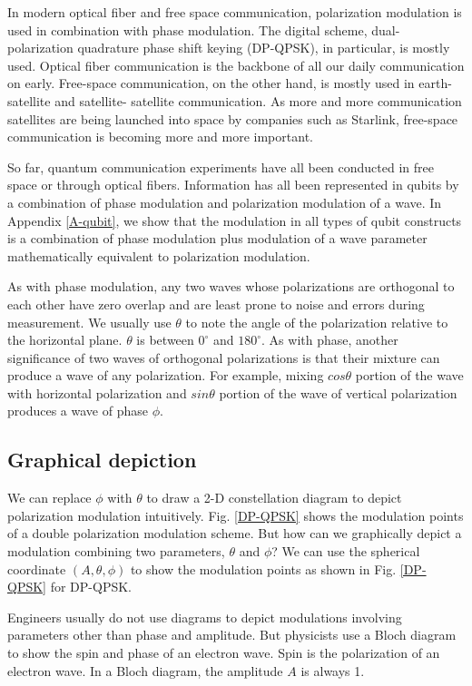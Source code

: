 \documentclass[oneside, letter, 12pt]{book}
\begin{document}
In modern optical fiber and free space communication, polarization modulation is used in combination with phase modulation. The digital scheme, dual-polarization quadrature phase shift keying (DP-QPSK), in particular, is mostly used. Optical fiber communication is the backbone of all our daily communication on early. Free-space communication, on the other hand, is mostly used in earth-satellite and satellite- satellite communication. As more and more communication satellites are being launched into space by companies such as Starlink, free-space communication is becoming more and more important.

So far, quantum communication experiments have all been conducted in free space or through optical fibers. Information has all been represented in qubits by a combination of phase modulation and polarization modulation of a wave. In Appendix \ref{A-qubit}, we show that the modulation in all types of qubit constructs is a combination of phase modulation plus modulation of a wave parameter mathematically equivalent to polarization modulation.

As with phase modulation, any two waves whose polarizations are orthogonal to each other have zero overlap and are least prone to noise and errors during measurement. We usually use $\theta$ to note the angle of the polarization relative to the horizontal plane. $\theta$ is between $0^\circ$ and $180^\circ$. As with phase, another significance of two waves of orthogonal polarizations is that their mixture can produce a wave of any polarization. For example, mixing $cos\theta$ portion of the wave with horizontal polarization and $sin\theta$ portion of the wave of vertical polarization produces a wave of phase $\phi$. 

\subsection{Graphical depiction}
We can replace $\phi$ with $\theta$ to draw a 2-D constellation diagram to depict polarization modulation intuitively. Fig. \ref{DP-QPSK} shows the modulation points of a double polarization modulation scheme. But how can we graphically depict a modulation combining two parameters, $\theta$ and $\phi$? We can use the spherical coordinate $(A, \theta, \phi)$ to show the modulation points as shown in Fig. \ref{DP-QPSK} for DP-QPSK.

Engineers usually do not use diagrams to depict modulations involving parameters other than phase and amplitude. But physicists use a Bloch diagram to show the spin and phase of an electron wave. Spin is the polarization of an electron wave. In a Bloch diagram, the amplitude $A$ is always 1.
\end{document}
